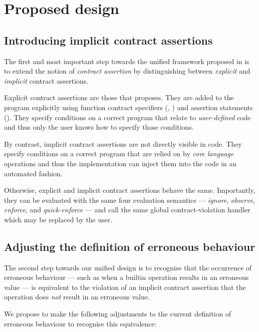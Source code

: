\section{Proposed design}

\subsection{Introducing implicit contract assertions}

The first  and most important step towards the unified framework proposed in \cite{P3100R1} is to extend the notion of \emph{contract assertion} by distinguishing between \emph{explicit} and \emph{implicit} contract assertions.

Explicit contract assertions are those that \cite{P2900R13} proposes. They are added to the program explicitly using function contract specifiers (, ) and assertion statements (\mbox{}). They specify conditions on a correct program that relate to \emph{user-defined} code and thus only the user knows how to specify those conditions.

By contrast, implicit contract assertions are not directly visible in code. They specify conditions on a correct program that are relied on by \emph{core language} operations and thus the implementation can inject them into the code in an automated fashion.

Otherwise, explicit and implicit contract assertions behave the same. Importantly, they can be evaluated with the same four evaluation semantics --- \emph{ignore}, \emph{observe}, \emph{enforce}, and \emph{quick-enforce} --- and call the same global contract-violation handler which may be replaced by the user.

\subsection{Adjusting the definition of erroneous behaviour}

The second step towards our unified design is to recognise that the occurrence of erroneous behaviour --- such as when a builtin operation results in an erroneous value --- is equivalent to the violation of an implicit contract assertion that the operation does \emph{not} result in an erroneous value.

We propose to make the following adjustments to the current definition of erroneous behaviour to recognise this equivalence:

